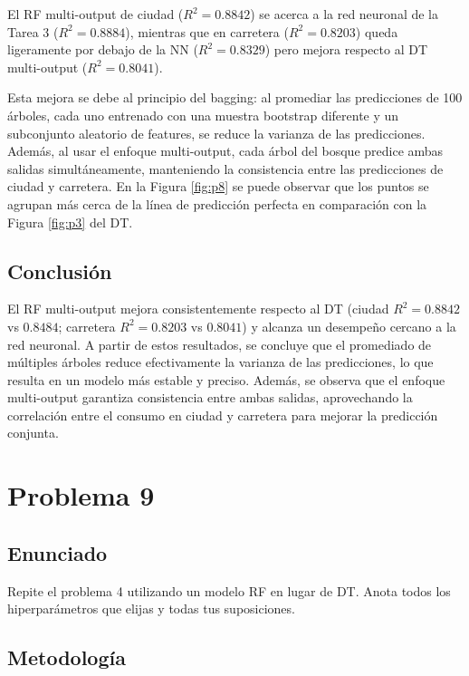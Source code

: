\documentclass{article}
\begin{document}
El RF multi-output de ciudad ($R^2 = 0.8842$) se acerca a la red neuronal de la Tarea 3 ($R^2 = 0.8884$), mientras que en carretera ($R^2 = 0.8203$) queda ligeramente por debajo de la NN ($R^2 = 0.8329$) pero mejora respecto al DT multi-output ($R^2 = 0.8041$).

Esta mejora se debe al principio del bagging: al promediar las predicciones de 100 árboles, cada uno entrenado con una muestra bootstrap diferente y un subconjunto aleatorio de features, se reduce la varianza de las predicciones. Además, al usar el enfoque multi-output, cada árbol del bosque predice ambas salidas simultáneamente, manteniendo la consistencia entre las predicciones de ciudad y carretera. En la Figura \ref{fig:p8} se puede observar que los puntos se agrupan más cerca de la línea de predicción perfecta en comparación con la Figura \ref{fig:p3} del DT.

\subsection{Conclusión}

El RF multi-output mejora consistentemente respecto al DT (ciudad $R^2 = 0.8842$ vs $0.8484$; carretera $R^2 = 0.8203$ vs $0.8041$) y alcanza un desempeño cercano a la red neuronal. A partir de estos resultados, se concluye que el promediado de múltiples árboles reduce efectivamente la varianza de las predicciones, lo que resulta en un modelo más estable y preciso. Además, se observa que el enfoque multi-output garantiza consistencia entre ambas salidas, aprovechando la correlación entre el consumo en ciudad y carretera para mejorar la predicción conjunta.

\section{Problema 9}

\subsection{Enunciado}

Repite el problema 4 utilizando un modelo RF en lugar de DT. Anota todos los hiperparámetros que elijas y todas tus suposiciones.

\subsection{Metodología}
\end{document}
